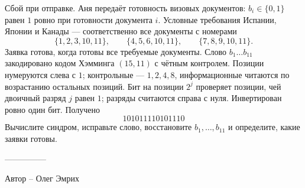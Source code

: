 \question
Сбой при отправке. Аня передаёт готовность визовых документов: $b_i\in\{0,1\}$ равен $1$ ровно при готовности документа $i$. Условные требования Испании, Японии и Канады --- соответственно все документы с номерами
\[
\{1,2,3,10,11\},\qquad \{4,5,6,10,11\},\qquad \{7,8,9,10,11\}.
\]
Заявка готова, когда готовы все требуемые документы. Слово $b_1\ldots b_{11}$ закодировано кодом Хэмминга $(15,11)$ с чётным контролем. Позиции нумеруются слева с $1$; контрольные --- $1,2,4,8$, информационные читаются по возрастанию остальных позиций. Бит на позиции $2^j$ проверяет позиции, чей двоичный разряд $j$ равен $1$; разряды считаются справа с нуля. Инвертирован ровно один бит. Получено
\[
101011110101110
\]
Вычислите синдром, исправьте слово, восстановите $b_1,\ldots,b_{11}$ и определите, какие заявки готовы.

---------------

Автор -- Олег Эмрих
